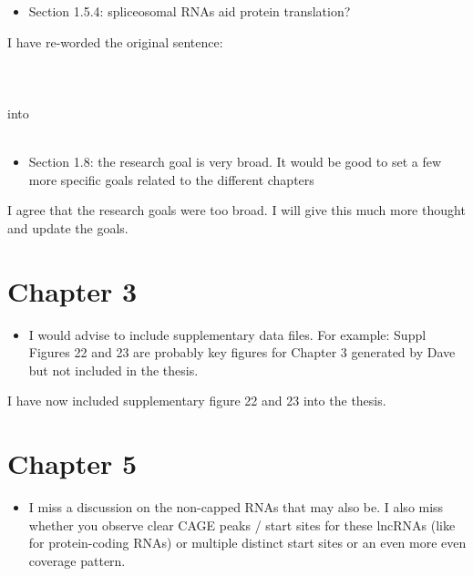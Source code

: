 \documentclass[10pt,a4paper,sans]{article}
\begin{document}
\newpage

\begin{itemize}
   \item{Section 1.5.4: spliceosomal RNAs aid protein translation?}
\end{itemize}
\noindent
I have re-worded the original sentence:
\\\\
\\\\
into
\\\\

\begin{itemize}
   \item{Section 1.8: the research goal is very broad. It would be good to set a few more specific goals related to the different chapters}
\end{itemize}
\noindent
I agree that the research goals were too broad. I will give this much more thought and update the goals.

\section{Chapter 3}

\begin{itemize}
   \item{I would advise to include supplementary data files. For example: Suppl Figures 22 and 23 are probably key figures for Chapter 3 generated by Dave but not included in the thesis.}
\end{itemize}
\noindent
I have now included supplementary figure 22 and 23 into the thesis.

\section{Chapter 5}

\begin{itemize}
   \item{I miss a discussion on the non-capped RNAs that may also be. I also miss whether you observe clear CAGE peaks / start sites for these lncRNAs (like for protein-coding RNAs) or multiple distinct start sites or an even more even coverage pattern.}
\end{itemize}
\end{document}
